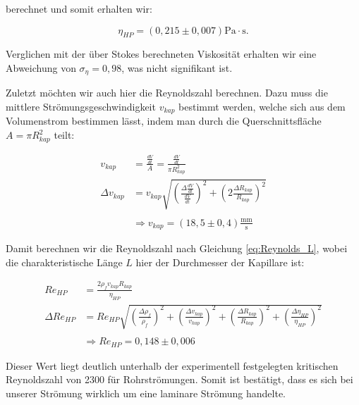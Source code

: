 \documentclass{article}
\begin{document}
berechnet und somit erhalten wir:

\begin{equation}
    \eta_{HP} = (0,215 \pm 0,007) \text{Pa} \cdot \text{s}.
\end{equation}

Verglichen mit der über Stokes berechneten Viskosität erhalten wir eine Abweichung von $\sigma_{\eta} = 0,98$, was nicht signifikant ist.

Zuletzt möchten wir auch hier die Reynoldszahl berechnen. Dazu muss die mittlere Strömungsgeschwindigkeit $v_{kap}$ bestimmt werden, welche sich aus dem Volumenstrom bestimmen lässt, indem man durch die Querschnittsfläche $A = \pi R_{kap}^2$ teilt:

\begin{equation}
    \begin{split}
        v_{kap} &= \frac{\frac{dV}{dt}}{A} = \frac{\frac{dV}{dt}}{\pi R_{kap}^2} \\
        \Delta v_{kap} &= v_{kap} \sqrt{\left( \frac{\Delta \frac{dV}{dt}}{\frac{dV}{dt}} \right)^2 + \left( 2 \frac{\Delta R_{kap}}{R_{kap}} \right)^2} \\ \\
        &\Rightarrow v_{kap} = (18,5 \pm 0,4) \frac{\text{mm}}{\text{s}}
    \end{split}
\end{equation}

Damit berechnen wir die Reynoldszahl nach Gleichung \ref{eq:Reynolds_L}, wobei die charakteristische Länge $L$ hier der Durchmesser der Kapillare ist:

\begin{equation}
    \begin{split}
        Re_{HP} &= \frac{2 \rho_f v_{kap} R_{kap}}{\eta_{HP}} \\
        \Delta Re_{HP} &= Re_{HP} \sqrt{\left( \frac{\Delta \rho_f}{\rho_f} \right)^2 + \left( \frac{\Delta v_{kap}}{v_{kap}} \right)^2 + \left( \frac{\Delta R_{kap}}{R_{kap}} \right)^2 + \left( \frac{\Delta \eta_{HP}}{\eta_{HP}} \right)^2} \\ \\
        &\Rightarrow Re_{HP} = 0,148 \pm 0,006
    \end{split}
\end{equation}

Dieser Wert liegt deutlich unterhalb der experimentell festgelegten kritischen Reynoldszahl von 2300 für Rohrströmungen. Somit ist bestätigt, dass es sich bei unserer Strömung wirklich um eine laminare Strömung handelte.
\end{document}

